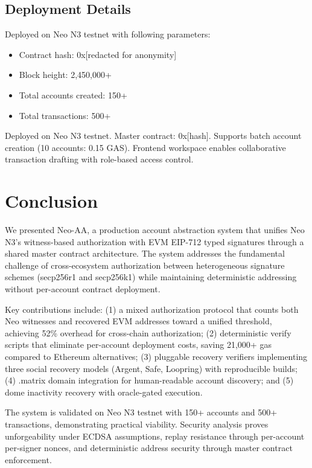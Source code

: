 \documentclass[10pt,twocolumn]{article}
\begin{document}
\subsection{Deployment Details}

Deployed on Neo N3 testnet with following parameters:
\begin{itemize}[leftmargin=*,topsep=2pt,itemsep=1pt]
\item Contract hash: 0x[redacted for anonymity]
\item Block height: 2,450,000+
\item Total accounts created: 150+
\item Total transactions: 500+
\end{itemize}


Deployed on Neo N3 testnet. Master contract: 0x[hash]. Supports batch account creation (10 accounts: 0.15 GAS). Frontend workspace enables collaborative transaction drafting with role-based access control.



\section{Conclusion}

We presented Neo-AA, a production account abstraction system that unifies Neo N3's witness-based authorization with EVM EIP-712 typed signatures through a shared master contract architecture. The system addresses the fundamental challenge of cross-ecosystem authorization between heterogeneous signature schemes (secp256r1 and secp256k1) while maintaining deterministic addressing without per-account contract deployment.

Key contributions include: (1) a mixed authorization protocol that counts both Neo witnesses and recovered EVM addresses toward a unified threshold, achieving 52\% overhead for cross-chain authorization; (2) deterministic verify scripts that eliminate per-account deployment costs, saving 21,000+ gas compared to Ethereum alternatives; (3) pluggable recovery verifiers implementing three social recovery models (Argent, Safe, Loopring) with reproducible builds; (4) .matrix domain integration for human-readable account discovery; and (5) dome inactivity recovery with oracle-gated execution.

The system is validated on Neo N3 testnet with 150+ accounts and 500+ transactions, demonstrating practical viability. Security analysis proves unforgeability under ECDSA assumptions, replay resistance through per-account per-signer nonces, and deterministic address security through master contract enforcement.
\end{document}
